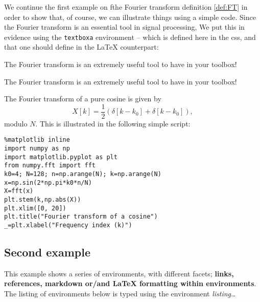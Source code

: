     We continue the first example on fthe Fourier transform definition
\ref{def:FT} in order to show that, of course, we can illustrate things
using a simple code. Since the Fourier transform is an essential tool in
signal processing, We put this in evidence using the \texttt{textboxa}
environment -- which is defined here in the css, and that one should
define in the LaTeX counterpart:

\begin{listing}
\begin{textboxa}
The Fourier transform is an extremely useful tool to have in your toolbox!
\end{textboxa}
\end{listing}

    \begin{textboxa}
The Fourier transform is an extremely useful tool to have in your toolbox!
\end{textboxa}

    The Fourier transform of a pure cosine is given by \[
X[k] = \frac{1}{2} \left( \delta[k-k_0] + \delta[k-k_0] \right), 
\] modulo \(N\). This is illustrated in the following simple script:
\begin{lstlisting}
%matplotlib inline
import numpy as np
import matplotlib.pyplot as plt 
from numpy.fft import fft
k0=4; N=128; n=np.arange(N); k=np.arange(N)
x=np.sin(2*np.pi*k0*n/N)
X=fft(x)
plt.stem(k,np.abs(X))
plt.xlim([0, 20])
plt.title("Fourier transform of a cosine")
_=plt.xlabel("Frequency index (k)")
\end{lstlisting}%
%
    \begin{center}
    \end{center}
    
    \subsection{Second example}\label{second-example}

    This example shows a series of environments, with different facets;
\textbf{links, references, markdown or/and LaTeX formatting within
environments}. The listing of environments below is typed using the
environment \emph{listing}\ldots{}

